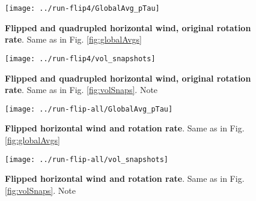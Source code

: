 \documentclass[a4paper,11pt]{article}
\begin{document}

\begin{figure}
\centering
\texttt{[image: ../run-flip4/GlobalAvg\_pTau]}
\caption{\textbf{Flipped and quadrupled horizontal wind, original rotation rate}. Same as in Fig. \ref{fig:globalAvgs}}
\label{fig:flipr_GlobalAvgs}
\end{figure}

\begin{figure}
\centering
\texttt{[image: ../run-flip4/vol\_snapshots]}
\caption{\textbf{Flipped and quadrupled horizontal wind, original rotation rate}. Same as in Fig. \ref{fig:volSnaps}. Note }
\label{fig:flip4_olSnaps}
\end{figure}


\begin{figure}
\centering
\texttt{[image: ../run-flip-all/GlobalAvg\_pTau]}
\caption{\textbf{Flipped horizontal wind and rotation rate}. Same as in Fig. \ref{fig:globalAvgs}}
\label{fig:flip_all_GlobalAvgs}
\end{figure}

\begin{figure}
\centering
\texttt{[image: ../run-flip-all/vol\_snapshots]}
\caption{\textbf{Flipped horizontal wind and rotation rate}. Same as in Fig. \ref{fig:volSnaps}. Note }
\label{fig:flip_all_volSnaps}
\end{figure}
\end{document}
